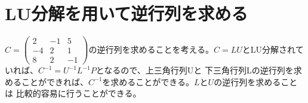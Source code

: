 \documentclass[titlepage]{jsarticle}
\begin{document}
	\section{LU分解を用いて逆行列を求める}
		$\displaystyle
	            C = \left(
	                \begin{array}{ccc}
	                    2 & -1 & 5 \\
	                    -4 & 2 & 1 \\
	                    8 & 2 & -1
	                \end{array}
	            \right)
      		$の逆行列を求めることを考える。$C=LU$とLU分解されていれば、$C^{-1}=U^{-1}L^{-1}P$となるので、上三角行列Uと
		下三角行列Lの逆行列を求めることができれば、$C^{-1}$を求めることができる。$L$と$U$の逆行列を求めることは
		比較的容易に行うことができる。
\end{document}
